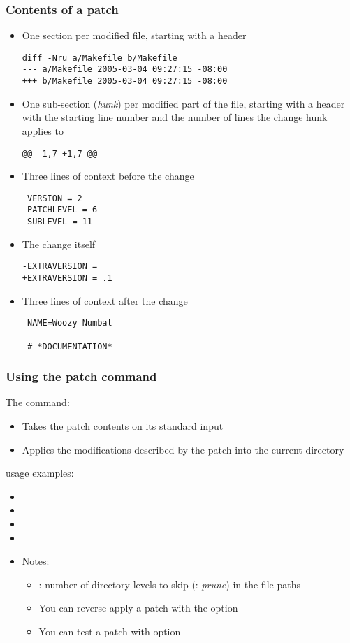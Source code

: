 \begin{frame}[fragile]
  \frametitle{Contents of a patch}
\footnotesize
  \begin{itemize}
  \item One section per modified file, starting with a header
\scriptsize
\begin{verbatim}
diff -Nru a/Makefile b/Makefile
--- a/Makefile 2005-03-04 09:27:15 -08:00
+++ b/Makefile 2005-03-04 09:27:15 -08:00
\end{verbatim}
\small
  \item One sub-section ({\em hunk}) per modified part of the file, starting with
    a header with the starting line number and the number of lines the
    change hunk applies to
\scriptsize
\begin{verbatim}
@@ -1,7 +1,7 @@
\end{verbatim}
\small
  \item Three lines of context before the change
\scriptsize
\begin{verbatim}
 VERSION = 2
 PATCHLEVEL = 6
 SUBLEVEL = 11
\end{verbatim}
\small
  \item The change itself
\scriptsize
\begin{verbatim}
-EXTRAVERSION =
+EXTRAVERSION = .1
\end{verbatim}
\small
    \item Three lines of context after the change
\scriptsize
\begin{verbatim}
 NAME=Woozy Numbat

 # *DOCUMENTATION*
\end{verbatim}
    \end{itemize}
\end{frame}

\begin{frame}
  \frametitle{Using the patch command}
  The  command:
  \begin{itemize}
  \item Takes the patch contents on its standard input
  \item Applies the modifications described by the patch into the
    current directory
  \end{itemize}
   usage examples:
  \begin{itemize}
  \item {}
  \item {}
  \item {}
  \item {}
  \item Notes:
    \begin{itemize}
    \item {}: number of directory levels to skip (: {\em
          prune}) in the file paths
    \item You can reverse apply a patch with the  option
    \item You can test a patch with  option
    \end{itemize}
  \end{itemize}
\end{frame}

